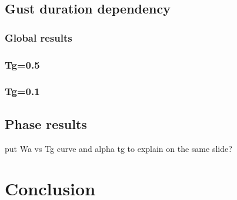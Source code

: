 \documentclass[compress]{beamer}
\begin{document}
\subsection{Gust duration dependency}

\begin{frame}
  \frametitle{Global results}
\end{frame}

\begin{frame}
  \frametitle{Tg=0.5}
\end{frame}

\begin{frame}
  \frametitle{Tg=0.1}
\end{frame}


\subsection{Phase results}

\begin{frame}
  put Wa vs Tg curve and alpha tg to explain on the same slide?
\end{frame}

\section{Conclusion}
\end{document}
